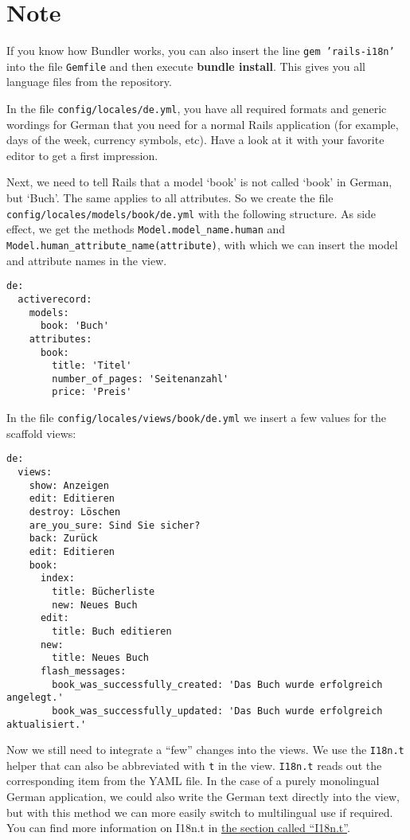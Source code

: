\documentclass[a4paper]{book}
\begin{document}
\section{Note}\label{note-46}

If you know how Bundler works, you can also insert the line \texttt{gem 'rails-i18n'} into the file \texttt{Gemfile} and then execute \textbf{bundle install}. This gives you all language files from the repository.

In the file \texttt{config/locales/de.yml}, you have all required formats and generic wordings for German that you need for a normal Rails application (for example, days of the week, currency symbols, etc). Have a look at it with your favorite editor to get a first impression.

Next, we need to tell Rails that a model `book' is not called `book' in German, but `Buch'. The same applies to all attributes. So we create the file \texttt{config/locales/models/book/de.yml} with the following structure. As side effect, we get the methods \texttt{Model.model\_name.human} and \texttt{Model.human\_attribute\_name(attribute)}, with which we can insert the model and attribute names in the view.

\begin{shaded}\begin{verbatim}
de:
  activerecord:
    models:
      book: 'Buch'
    attributes:
      book:
        title: 'Titel'
        number_of_pages: 'Seitenanzahl'
        price: 'Preis'
\end{verbatim}\end{shaded}

In the file \texttt{config/locales/views/book/de.yml} we insert a few values for the scaffold views:

\begin{shaded}\begin{verbatim}
de:
  views:
    show: Anzeigen
    edit: Editieren
    destroy: Löschen
    are_you_sure: Sind Sie sicher?
    back: Zurück
    edit: Editieren
    book:
      index:
        title: Bücherliste
        new: Neues Buch
      edit:
        title: Buch editieren
      new:
        title: Neues Buch
      flash_messages:
        book_was_successfully_created: 'Das Buch wurde erfolgreich angelegt.'
        book_was_successfully_updated: 'Das Buch wurde erfolgreich aktualisiert.'
\end{verbatim}\end{shaded}

Now we still need to integrate a “few” changes into the views. We use the \texttt{I18n.t} helper that can also be abbreviated with \texttt{t} in the view. \texttt{I18n.t} reads out the corresponding item from the YAML file. In the case of a purely monolingual German application, we could also write the German text directly into the view, but with this method we can more easily switch to multilingual use if required. You can find more information on I18n.t in \hyperref[i18nux5fi18nux5ft]{the section called “I18n.t”}.
\end{document}
